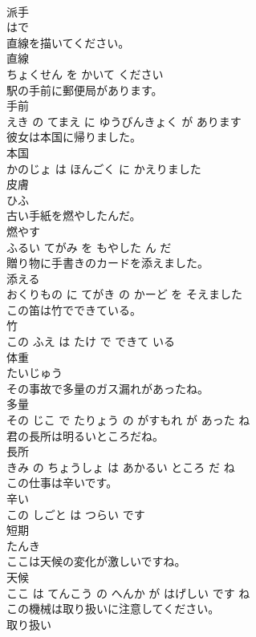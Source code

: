 \documentclass[8pt]{extreport}
\begin{document}
\begin{CJK}{UTF8}{min}
\\	派手	
\\	はで			
\\	直線を描いてください。	
\\	直線 
\\	ちょくせん を かいて ください			
\\	駅の手前に郵便局があります。	
\\	手前 
\\	えき の てまえ に ゆうびんきょく が あります			
\\	彼女は本国に帰りました。	
\\	本国 
\\	かのじょ は ほんごく に かえりました			
\\	皮膚	
\\	ひふ			
\\	古い手紙を燃やしたんだ。	
\\	燃やす 
\\	ふるい てがみ を もやした ん だ			
\\	贈り物に手書きのカードを添えました。	
\\	添える 
\\	おくりもの に てがき の かーど を そえました			
\\	この笛は竹でできている。	
\\	竹 
\\	この ふえ は たけ で できて いる			
\\	体重	
\\	たいじゅう			
\\	その事故で多量のガス漏れがあったね。	
\\	多量 
\\	その じこ で たりょう の がすもれ が あった ね			
\\	君の長所は明るいところだね。	
\\	長所 
\\	きみ の ちょうしょ は あかるい ところ だ ね			
\\	この仕事は辛いです。	
\\	辛い 
\\	この しごと は つらい です			
\\	短期	
\\	たんき			
\\	ここは天候の変化が激しいですね。	
\\	天候 
\\	ここ は てんこう の へんか が はげしい です ね			
\\	この機械は取り扱いに注意してください。	
\\	取り扱い 

\end{CJK}
\end{document}
